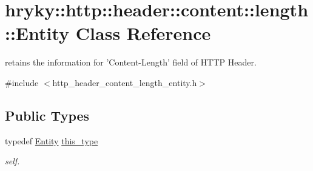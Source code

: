 \hypertarget{classhryky_1_1http_1_1header_1_1content_1_1length_1_1_entity}{\section{hryky\-:\-:http\-:\-:header\-:\-:content\-:\-:length\-:\-:Entity Class Reference}
\label{classhryky_1_1http_1_1header_1_1content_1_1length_1_1_entity}
}


retains the information for 'Content-\/\-Length' field of H\-T\-T\-P Header.  




{\ttfamily \#include $<$http\-\_\-header\-\_\-content\-\_\-length\-\_\-entity.\-h$>$}

\subsection*{Public Types}
\begin{DoxyCompactItemize}
\item 
\hypertarget{classhryky_1_1http_1_1header_1_1content_1_1length_1_1_entity_aafaa68899d88e773bb1aba75625e397d}{typedef \hyperlink{classhryky_1_1http_1_1header_1_1content_1_1length_1_1_entity}{Entity} \hyperlink{classhryky_1_1http_1_1header_1_1content_1_1length_1_1_entity_aafaa68899d88e773bb1aba75625e397d}{this\-\_\-type}}\label{classhryky_1_1http_1_1header_1_1content_1_1length_1_1_entity_aafaa68899d88e773bb1aba75625e397d}

\begin{DoxyCompactList}\small\item\em self. \end{DoxyCompactList}\end{DoxyCompactItemize}

